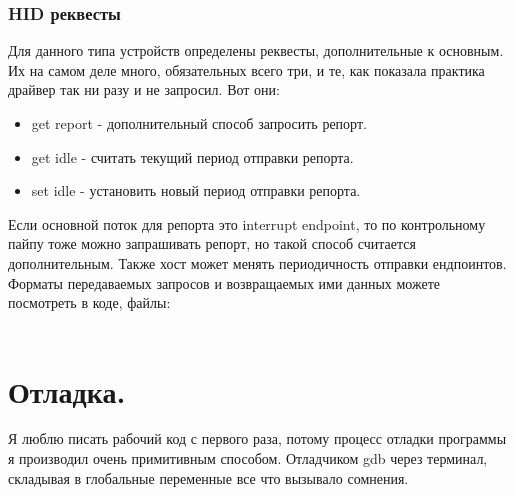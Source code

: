 \documentclass[12pt,a4paper]{article}
\begin{document}
\subsubsection{HID реквесты}
    Для данного типа устройств определены реквесты, дополнительные к основным.
    Их на самом деле много, обязательных всего три, и те, как показала практика
    драйвер так ни разу и не запросил. Вот они:
\begin{itemize}
    \item get report - дополнительный способ запросить репорт.
    \item get idle - считать текущий период отправки репорта.
    \item set idle - установить новый период отправки репорта.
\end{itemize}
    Если основной поток для репорта это interrupt endpoint, то по контрольному
    пайпу тоже можно запрашивать репорт, но такой способ считается
    дополнительным. Также хост может менять периодичность отправки ендпоинтов.
    Форматы передаваемых запросов и возвращаемых ими данных можете посмотреть
     в коде, файлы:\\
    \\

\section{Отладка.}
    Я люблю писать рабочий код с первого раза, потому процесс отладки
    программы я производил очень примитивным способом. Отладчиком gdb через
    терминал, складывая в глобальные переменные все что вызывало сомнения.


\end{document}
